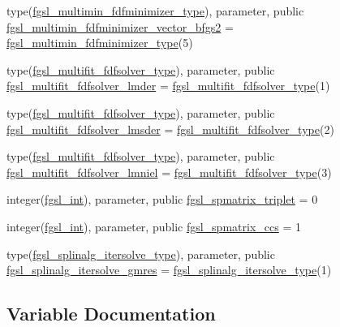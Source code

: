 \begin{DoxyCompactItemize}
\item 
type(\hyperlink{structfgsl_1_1fgsl__multimin__fdfminimizer__type}{fgsl\+\_\+multimin\+\_\+fdfminimizer\+\_\+type}), parameter, public \hyperlink{namespacefgsl_a6cc130b66b81b66a085cfb1882c711e6}{fgsl\+\_\+multimin\+\_\+fdfminimizer\+\_\+vector\+\_\+bfgs2} = \hyperlink{structfgsl_1_1fgsl__multimin__fdfminimizer__type}{fgsl\+\_\+multimin\+\_\+fdfminimizer\+\_\+type}(5)
\item 
type(\hyperlink{structfgsl_1_1fgsl__multifit__fdfsolver__type}{fgsl\+\_\+multifit\+\_\+fdfsolver\+\_\+type}), parameter, public \hyperlink{namespacefgsl_a8d1aeaeb6d1cc87ec0d79eddf44965b8}{fgsl\+\_\+multifit\+\_\+fdfsolver\+\_\+lmder} = \hyperlink{structfgsl_1_1fgsl__multifit__fdfsolver__type}{fgsl\+\_\+multifit\+\_\+fdfsolver\+\_\+type}(1)
\item 
type(\hyperlink{structfgsl_1_1fgsl__multifit__fdfsolver__type}{fgsl\+\_\+multifit\+\_\+fdfsolver\+\_\+type}), parameter, public \hyperlink{namespacefgsl_a24b9409272a5a9556e295c38502b6dbc}{fgsl\+\_\+multifit\+\_\+fdfsolver\+\_\+lmsder} = \hyperlink{structfgsl_1_1fgsl__multifit__fdfsolver__type}{fgsl\+\_\+multifit\+\_\+fdfsolver\+\_\+type}(2)
\item 
type(\hyperlink{structfgsl_1_1fgsl__multifit__fdfsolver__type}{fgsl\+\_\+multifit\+\_\+fdfsolver\+\_\+type}), parameter, public \hyperlink{namespacefgsl_a144e01074d63149cca26a52ae3ee1ad0}{fgsl\+\_\+multifit\+\_\+fdfsolver\+\_\+lmniel} = \hyperlink{structfgsl_1_1fgsl__multifit__fdfsolver__type}{fgsl\+\_\+multifit\+\_\+fdfsolver\+\_\+type}(3)
\item 
integer(\hyperlink{namespacefgsl_a222deda1d7a0c0e845ce4a683318efeb}{fgsl\+\_\+int}), parameter, public \hyperlink{namespacefgsl_ad1d59263ef6dcca33e1e5408bd60e2dd}{fgsl\+\_\+spmatrix\+\_\+triplet} = 0
\item 
integer(\hyperlink{namespacefgsl_a222deda1d7a0c0e845ce4a683318efeb}{fgsl\+\_\+int}), parameter, public \hyperlink{namespacefgsl_a9df148463077417441f15cbe0a523a2e}{fgsl\+\_\+spmatrix\+\_\+ccs} = 1
\item 
type(\hyperlink{structfgsl_1_1fgsl__splinalg__itersolve__type}{fgsl\+\_\+splinalg\+\_\+itersolve\+\_\+type}), parameter, public \hyperlink{namespacefgsl_aaba217bc420e45e1706c82a957de5e7c}{fgsl\+\_\+splinalg\+\_\+itersolve\+\_\+gmres} = \hyperlink{structfgsl_1_1fgsl__splinalg__itersolve__type}{fgsl\+\_\+splinalg\+\_\+itersolve\+\_\+type}(1)
\end{DoxyCompactItemize}


\subsection{Variable Documentation}
\hypertarget{namespacefgsl_a64406a5e119fa92e47b1adcddb152e91}{}

